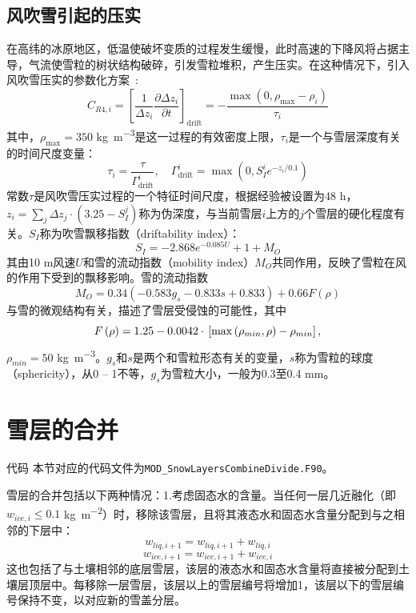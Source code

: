 \subsection{风吹雪引起的压实}
在高纬的冰原地区，低温使破坏变质的过程发生缓慢，此时高速的下降风将占据主导，气流使雪粒的树状结构破碎，引发雪粒堆积，产生压实。在这种情况下，引入风吹雪压实的参数化方案~\citep{Vionnet2012}:
\begin{equation}
    C_{R4,i}=\left[\frac{1}{\Delta z_i}\frac{\partial \Delta z_i}{\partial t}\right]_{\text{drift}}=-\frac{\max \left(0,\rho_{\text{max}}-\rho_i\right)}{\tau_i}
\end{equation}
其中，$\rho_{\text{max}}=350$ \unit{kg.m^{-3}}是这一过程的有效密度上限，$\tau_i$是一个与雪层深度有关的时间尺度变量：
\begin{equation}
    \tau_i=\frac{\tau}{\Gamma_{\text{drift}}^i}, \quad \Gamma_{\text{drift}}^i=\max \left(0,S_I^i e^{-z_i/0.1}\right)
\end{equation}
常数$\tau$是风吹雪压实过程的一个特征时间尺度，根据经验被设置为48 \unit{h}，$z_i=\sum_j \Delta z_j \cdot \left(3.25-S_I^j\right)$称为伪深度，与当前雪层$i$上方的$j$个雪层的硬化程度有关。$S_I$称为吹雪飘移指数（driftability index）：
\begin{equation}
    S_I=-2.868 e^{-0.085 U} + 1 + M_O
\end{equation}
其由10 \unit{m}风速$U$和雪的流动指数（mobility index）$M_O$共同作用，反映了雪粒在风的作用下受到的飘移影响。雪的流动指数
\begin{equation}
    M_O=0.34\left(-0.583g_s-0.833s+0.833\right)+0.66F\left(\rho\right)
\end{equation}
与雪的微观结构有关，描述了雪层受侵蚀的可能性，其中
$$F\left(\rho\right)=1.25-0.0042 \cdot \\\left[\max \left(\rho_{min},\rho\right)-\rho_{min}\right],$$$\rho_{min}=50$ \unit{kg.m^{-3}}。$g_s$和$s$是两个和雪粒形态有关的变量，$s$称为雪粒的球度（sphericity），从0 -- 1不等，$g_s$为雪粒大小，一般为0.3至0.4 \unit{mm}。


\section{雪层的合并}\label{雪层的合并}
\begin{mymdframed}{代码}
本节对应的代码文件为\texttt{MOD\_SnowLayersCombineDivide.F90}。
\end{mymdframed}

雪层的合并包括以下两种情况：1.考虑固态水的含量。当任何一层几近融化（即$w_{ice,i} \leqslant 0.1$ \unit{kg.m^{-2}}）时，移除该雪层，且将其液态水和固态水含量分配到与之相邻的下层中：
\begin{equation}
    w_{liq,i+1} = w_{liq,i+1} + w_{liq,i}
\end{equation}
\begin{equation}
    w_{ice,i+1} = w_{ice,i+1} + w_{ice,i}
\end{equation}
这也包括了与土壤相邻的底层雪层，该层的液态水和固态水含量将直接被分配到土壤层顶层中。每移除一层雪层，该层以上的雪层编号将增加1，该层以下的雪层编号保持不变，以对应新的雪盖分层。

